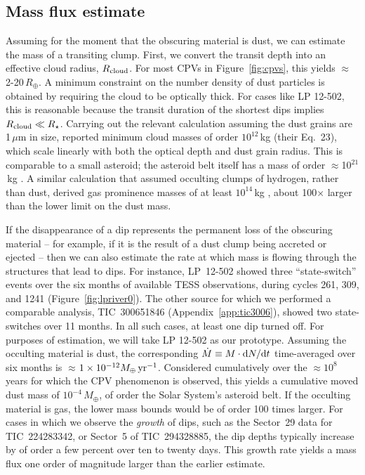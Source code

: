 \documentclass[11pt,twocolumn,tighten]{aastex63}
\begin{document}
\subsection{Mass flux estimate}
\label{subsec:massflux}

Assuming for the moment that the obscuring material is dust, we can
estimate the mass of a transiting clump. First, we convert the transit
depth into an effective cloud radius, $R_{\rm cloud}$.  For most CPVs
in Figure~\ref{fig:cpvs}, this yields $\approx$2-20\,$R_\oplus$.  A
minimum constraint on the number density of dust particles is obtained
by requiring the cloud to be optically thick.  For cases like LP
12-502, this is reasonable because the transit duration of the
shortest dips implies $R_{\rm cloud}\ll R_\star$.  Carrying out the
relevant calculation assuming the dust grains are 1\,$\mu$m in size,
\citet{2023MNRAS.518.4734S} reported minimum cloud masses of order
$10^{12}$\,kg (their Eq.~23), which scale linearly with both the
optical depth and dust grain radius.  This is comparable to a small
asteroid; the asteroid belt itself has a mass of order
$\approx$10$^{21}$\,kg \citep{2019Icar..319..812P}.  A similar
calculation that assumed occulting clumps of hydrogen, rather than
dust, derived gas prominence masses of at least $10^{14}$\,kg
\citep{1990MNRAS.247..415C}, about 100$\times$ larger than the lower
limit on the dust mass.

If the disappearance of a dip represents the permanent loss of the
obscuring material -- for example, if it is the result of a dust clump
being accreted or ejected -- then we can also estimate the rate at
which mass is flowing through the structures that lead to dips.  For
instance, LP~12-502 showed three ``state-switch'' events over the six
months of available TESS observations, during cycles 261, 309, and
1241 (Figure~\ref{fig:lpriver0}).  The other source for which we
performed a comparable analysis, TIC~300651846
(Appendix~\ref{app:tic3006}), showed two state-switches over 11
months.  In all such cases, at least one dip turned off.  For purposes
of estimation, we will take LP 12-502 as our prototype.  Assuming the
occulting material is dust, the corresponding $\dot{M} \equiv M\cdot
{\rm d}N/{\rm d}t$ time-averaged over six months is
$\approx$$1\times10^{-12} M_\oplus\,{\rm yr}^{-1}$.  Considered
cumulatively over the $\approx$$10^8$ years for which the CPV
phenomenon is observed, this yields a cumulative moved dust mass of
$10^{-4}\,M_\oplus$, of order the Solar System's asteroid belt.  If
the occulting material is gas, the lower mass bounds would be of order
100 times larger.  For cases in which we observe the {\it growth} of
dips, such as the Sector~29 data for TIC~224283342, or Sector~5 of
TIC~294328885, the dip depths typically increase by of order a few
percent over ten to twenty days.  This growth rate yields a mass flux
one order of magnitude larger than the earlier estimate.
\end{document}
